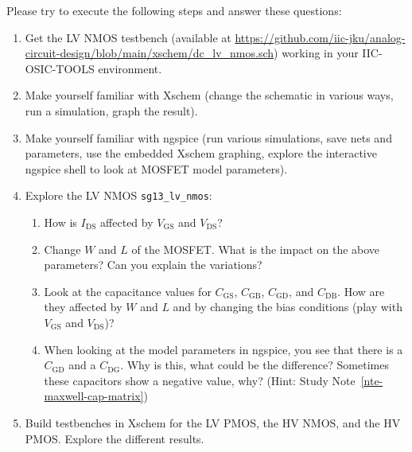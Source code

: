 \documentclass[
  a4paper,
  DIV=11,
  numbers=noendperiod]{scrartcl}
\providecommand{\tightlist}{%
  \setlength{\itemsep}{0pt}\setlength{\parskip}{0pt}}\usepackage{longtable,booktabs,array}
\begin{document}
\begin{tcolorbox}[enhanced jigsaw, titlerule=0mm, left=2mm, coltitle=black, toprule=.15mm, breakable, opacitybacktitle=0.6, colframe=quarto-callout-tip-color-frame, bottomtitle=1mm, toptitle=1mm, opacityback=0, colbacktitle=quarto-callout-tip-color!10!white, title=\textcolor{quarto-callout-tip-color}{\faLightbulb}\hspace{0.5em}{Exercise: MOSFET Investigation}, arc=.35mm, rightrule=.15mm, colback=white, bottomrule=.15mm, leftrule=.75mm]

Please try to execute the following steps and answer these questions:

\begin{enumerate}
\def\labelenumi{\arabic{enumi}.}
\tightlist
\item
  Get the LV NMOS testbench (available at
  \url{https://github.com/iic-jku/analog-circuit-design/blob/main/xschem/dc_lv_nmos.sch})
  working in your IIC-OSIC-TOOLS environment.
\item
  Make yourself familiar with Xschem (change the schematic in various
  ways, run a simulation, graph the result).
\item
  Make yourself familiar with ngspice (run various simulations, save
  nets and parameters, use the embedded Xschem graphing, explore the
  interactive ngspice shell to look at MOSFET model parameters).
\item
  Explore the LV NMOS \texttt{sg13\_lv\_nmos}:

  \begin{enumerate}
  \def\labelenumii{\arabic{enumii}.}
  \tightlist
  \item
    How is \(I_\mathrm{DS}\) affected by \(V_\mathrm{GS}\) and
    \(V_\mathrm{DS}\)?
  \item
    Change \(W\) and \(L\) of the MOSFET. What is the impact on the
    above parameters? Can you explain the variations?
  \item
    Look at the capacitance values for \(C_\mathrm{GS}\),
    \(C_\mathrm{GB}\), \(C_\mathrm{GD}\), and \(C_\mathrm{DB}\). How are
    they affected by \(W\) and \(L\) and by changing the bias conditions
    (play with \(V_\mathrm{GS}\) and \(V_\mathrm{DS}\))?
  \item
    When looking at the model parameters in ngspice, you see that there
    is a \(C_\mathrm{GD}\) and a \(C_\mathrm{DG}\). Why is this, what
    could be the difference? Sometimes these capacitors show a negative
    value, why? (Hint: Study Note~\ref{nte-maxwell-cap-matrix})
  \end{enumerate}
\item
  Build testbenches in Xschem for the LV PMOS, the HV NMOS, and the HV
  PMOS. Explore the different results.


\end{enumerate}
\end{tcolorbox}
\end{document}
